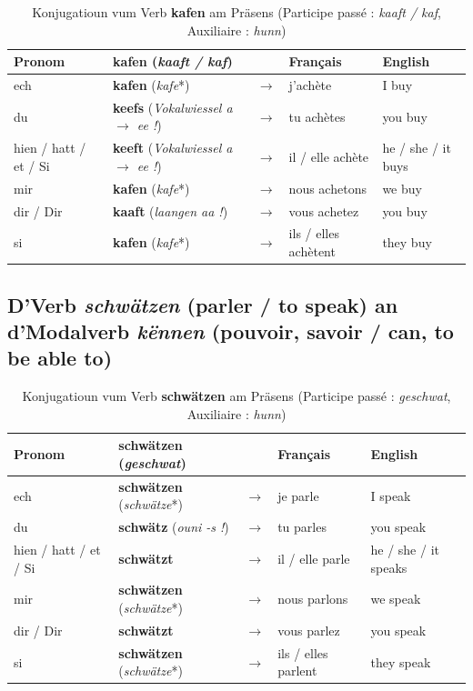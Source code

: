 \begin{table}[htbp]
    \centering
    \begin{tabular}{ll c l l}
        \toprule
        \textbf{Pronom} & \textbf{kafen} (\textit{kaaft / kaf}) & & \textbf{Français} & \textbf{English} \\
        \midrule
        ech & \textbf{kafen} (\textit{kafe}*) & $\rightarrow$ & j'achète & I buy \\
        du & \textbf{keefs} (\textit{Vokalwiessel a $\rightarrow$ ee !}) & $\rightarrow$ & tu achètes & you buy \\
        hien / hatt / et / Si & \textbf{keeft} (\textit{Vokalwiessel a $\rightarrow$ ee !}) & $\rightarrow$ & il / elle achète & he / she / it buys \\
        \midrule
        mir & \textbf{kafen} (\textit{kafe}*) & $\rightarrow$ & nous achetons & we buy \\
        dir / Dir & \textbf{kaaft} (\textit{laangen aa !}) & $\rightarrow$ & vous achetez & you buy \\
        si & \textbf{kafen} (\textit{kafe}*) & $\rightarrow$ & ils / elles achètent & they buy \\
        \bottomrule
    \end{tabular}
    \caption{Konjugatioun vum Verb \textbf{kafen} am Präsens (Participe passé : \textit{kaaft / kaf}, Auxiliaire : \textit{hunn})}
\end{table}

\subsection{D'Verb \textit{schwätzen} (parler / to speak) an d'Modalverb \textit{kënnen} (pouvoir, savoir / can, to be able to)}

\begin{table}[htbp]
    \centering
    \begin{tabular}{ll c l l}
        \toprule
        \textbf{Pronom} & \textbf{schwätzen} (\textit{geschwat}) & & \textbf{Français} & \textbf{English} \\
        \midrule
        ech & \textbf{schwätzen} (\textit{schwätze}*) & $\rightarrow$ & je parle & I speak \\
        du & \textbf{schwätz} (\textit{ouni -s !}) & $\rightarrow$ & tu parles & you speak \\
        hien / hatt / et / Si & \textbf{schwätzt} & $\rightarrow$ & il / elle parle & he / she / it speaks \\
        \midrule
        mir & \textbf{schwätzen} (\textit{schwätze}*) & $\rightarrow$ & nous parlons & we speak \\
        dir / Dir & \textbf{schwätzt} & $\rightarrow$ & vous parlez & you speak \\
        si & \textbf{schwätzen} (\textit{schwätze}*) & $\rightarrow$ & ils / elles parlent & they speak \\
        \bottomrule
    \end{tabular}
    \caption{Konjugatioun vum Verb \textbf{schwätzen} am Präsens (Participe passé : \textit{geschwat}, Auxiliaire : \textit{hunn})}
\end{table}

